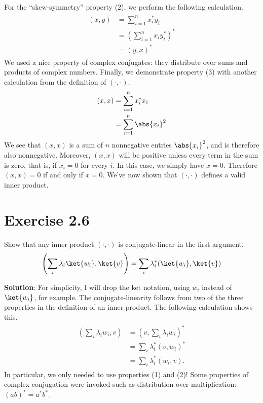 \documentclass{book}
\begin{document}
    For the ``skew-symmetry'' property (2), we perform the following calculation.
    \begin{align}
    \begin{aligned}
        (x, y) &= \sum_{i=1}^n x_i^* y_i \\
        &= \left(\sum_{i=1}^n x_i y_i^*\right)^* \\
        &= (y, x)^*
    \end{aligned}
    \end{align}
    We used a nice property of complex conjugates: they distribute over sums and products of complex numbers. Finally, we demonstrate property (3) with another calculation from the definition of $(\cdot, \cdot)$.
    \begin{align}
    \begin{aligned}
        (x, x) &= \sum_{i=1}^n x_i^* x_i \\
        &= \sum_{i=1}^n \abs{x_i}^2
    \end{aligned}
    \end{align}
    We see that $(x,x)$ is a sum of $n$ nonnegative entries $\abs{x_i}^2$, and is therefore also nonnegative. Moreover, $(x,x)$ will be positive unless every term in the sum is zero, that is, if $x_i = 0$ for every $i$. In this case, we simply have $x = 0$. Therefore $(x,x) = 0$ if and only if $x = 0$. We've now shown that $(\cdot, \cdot)$ defines a valid inner product.
    
\section*{Exercise 2.6}
    Show that any inner product $(\cdot, \cdot)$ is conjugate-linear in the first argument,
    \begin{align}
        \left(\sum_i \lambda_i \ket{w_i}, \ket{v}\right) = \sum_i \lambda_i^* (\ket{w_i}, \ket{v})
    \end{align}
    
    \textbf{Solution}: For simplicity, I will drop the ket notation, using $w_i$ instead of $\ket{w_i}$, for example. The conjugate-linearity follows from two of the three properties in the definition of an inner product. The following calculation shows this.
    \begin{align}
    \begin{aligned}
        \left(\sum_i \lambda_i w_i, v\right) &= \left(v, \sum_i \lambda_i w_i\right)^* \\
        &= \sum_i \lambda_i^* (v, w_i)^* \\
        &= \sum_i \lambda_i^* (w_i, v).
    \end{aligned}
    \end{align}
    In particular, we only needed to use properties (1) and (2)! Some properties of complex conjugation were invoked such as distribution over multiplication: $(ab)^* = a^* b^*$.
    
\end{document}
